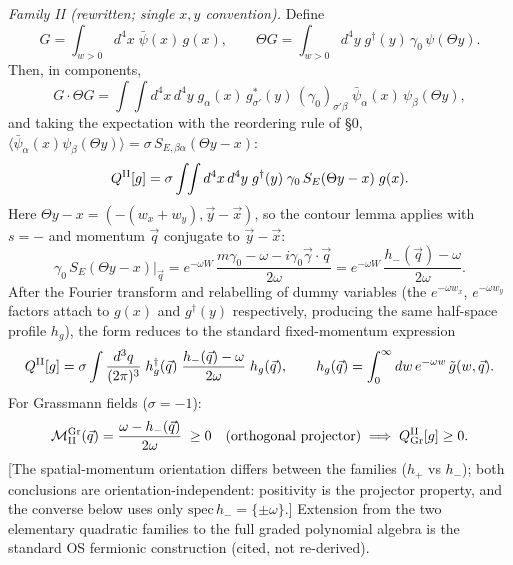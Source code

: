 \emph{Family II (rewritten; single $x,y$ convention).}
Define
\[
G=\int_{w>0}d^4x\;\bar\psi(x)\,g(x),
\qquad
\Theta G=\int_{w>0}d^4y\;g^\dagger(y)\,\gamma_0\,\psi(\Theta y).
\]
Then, in components,
\[
G\cdot\Theta G
=\int\!\!\int d^4x\,d^4y\;
g_\alpha(x)\,g^{*}_{\sigma'}(y)\,(\gamma_0)_{\sigma'\beta}\;
\bar\psi_\alpha(x)\,\psi_\beta(\Theta y),
\]
and taking the expectation with the reordering rule of \S0,
$\langle\bar\psi_\alpha(x)\psi_\beta(\Theta y)\rangle
=\sigma\,S_{E,\beta\alpha}(\Theta y-x)$:
\[
Q^{\rm II}[g]
=\sigma\int\!\!\int d^4x\,d^4y\;
g^\dagger(y)\;\gamma_0\,S_E(\Theta y-x)\;g(x).
\]
Here $\Theta y-x=(-(w_x+w_y),\vec y-\vec x)$, so the contour lemma
applies with $s=-$ and momentum $\vec q$ conjugate to
$\vec y-\vec x$:
\[
\gamma_0\,S_E(\Theta y-x)\Big|_{\vec q}
=e^{-\omega W}\,
\frac{m\gamma_0-\omega-i\gamma_0\vec\gamma\cdot\vec q}{2\omega}
=e^{-\omega W}\,\frac{h_-(\vec q)-\omega}{2\omega}.
\]
After the Fourier transform and relabelling of dummy variables
(the $e^{-\omega w_x}$, $e^{-\omega w_y}$ factors attach to $g(x)$
and $g^\dagger(y)$ respectively, producing the same half-space
profile $h_g$), the form reduces to the standard fixed-momentum
expression
\[
Q^{\rm II}[g]
=\sigma\int\frac{d^3q}{(2\pi)^3}\;
h_g^\dagger(\vec q)\;
\frac{h_-(\vec q)-\omega}{2\omega}\;
h_g(\vec q),
\qquad
h_g(\vec q)=\int_0^\infty dw\,e^{-\omega w}\,\tilde g(w,\vec q).
\]
For Grassmann fields ($\sigma=-1$):
\[
\mathcal M_{\rm II}^{\rm Gr}(\vec q)
=\frac{\omega-h_-(\vec q)}{2\omega}\;\ge0
\quad\text{(orthogonal projector)}
\;\Longrightarrow\;
Q_{\rm Gr}^{\rm II}[g]\ge0 .
\]
[The spatial-momentum orientation differs between the families
($h_+$ vs $h_-$); both conclusions are orientation-independent:
positivity is the projector property, and the converse below uses
only $\mathrm{spec}\,h_-=\{\pm\omega\}$.]
Extension from the two elementary quadratic families to the full
graded polynomial algebra is the standard OS fermionic construction
(cited, not re-derived).


